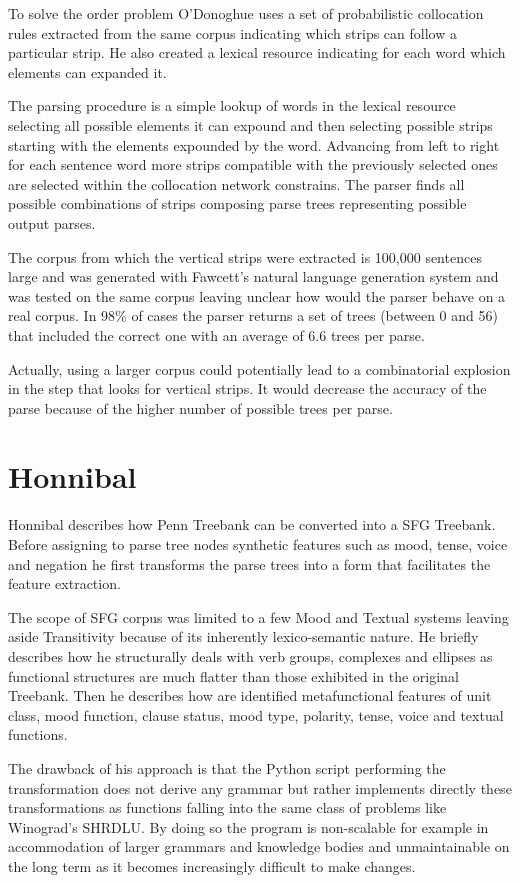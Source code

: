 To solve the order problem O'Donoghue uses a set of probabilistic collocation rules extracted from the same corpus indicating which strips can follow a particular strip. He also created a lexical resource indicating for each word which elements can expanded it.

The parsing procedure is a simple lookup of words in the lexical resource selecting all possible elements it can expound and then selecting possible strips starting with the elements expounded by the word. Advancing from left to right for each sentence word more strips compatible with the previously selected ones are selected within the collocation network constrains. The parser finds all possible combinations of strips composing parse trees representing possible output parses. 

The corpus from which the vertical strips were extracted is 100,000 sentences large and was generated with Fawcett's natural language generation system and was tested on the same corpus leaving unclear how would the parser behave on a real corpus. In 98\% of cases the parser returns a set of trees (between 0 and 56) that included the correct one with an average of 6.6 trees per parse. 

Actually, using a larger corpus could potentially lead to a combinatorial explosion in the step that looks for vertical strips. It would decrease the accuracy of the parse because of the higher number of possible trees per parse.

\section{Honnibal}
Honnibal \citeyearpar{Honnibal2004a,Honnibal2007} describes how Penn Treebank can be converted into a SFG Treebank. Before assigning to parse tree nodes synthetic features such as mood, tense, voice and negation he first transforms the parse trees into a form that facilitates the feature extraction. 

The scope of SFG corpus was limited to a few Mood and Textual systems leaving aside Transitivity because of its inherently lexico-semantic nature. He briefly describes how he structurally deals with verb groups, complexes and ellipses as functional structures are much flatter than those exhibited in the original Treebank. Then he describes how are identified metafunctional features of unit class, mood function, clause status, mood type, polarity, tense, voice and textual functions.

The drawback of his approach is that the Python script performing the transformation does not derive any grammar but rather implements directly these transformations as functions falling into the same class of problems like Winograd's SHRDLU. By doing so the program is non-scalable for example in accommodation of larger grammars and knowledge bodies and unmaintainable on the long term as it becomes increasingly difficult to make changes. 

